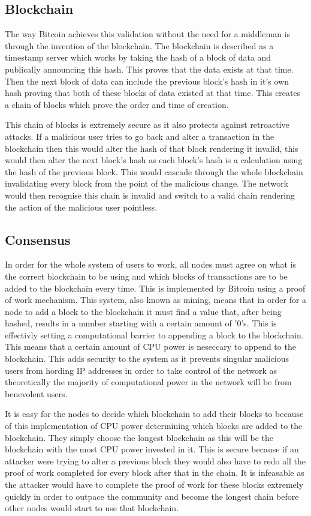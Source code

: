 \documentclass{l4proj}
\begin{document}
\subsection{Blockchain}
The way Bitcoin achieves this validation without the need for a middleman is through the invention of the blockchain.
The blockchain is described as a timestamp server which works by taking the hash of a block of data and publically
announcing this hash. This proves that the data exists at that time. Then the next block of data can include the
previous block's hash in it's own hash proving that both of these blocks of data existed at that time. This creates 
a chain of blocks which prove the order and time of creation.

This chain of blocks is extremely secure as it also protects against retroactive attacks. If a malicious user tries
to go back and alter a transaction in the blockchain then this would alter the hash of that block rendering it invalid,
this would then alter the next block's hash as each block's hash is a calculation using the hash of the previous block.
This would cascade through the whole blockchain invalidating every block from the point of the malicious change. The 
network would then recognise this chain is invalid and switch to a valid chain rendering the action of the malicious
user pointless.

\subsection{Consensus}
In order for the whole system of users to work, all nodes must agree on what is the correct blockchain to be using and
which blocks of transactions are to be added to the blockchain every time. This is implemented by Bitcoin using a proof of
work mechanism. This system, also known as mining, means that in order for a node to add a block to the blockchain it
must find a value that, after being hashed, results in a number starting with a certain amount of '0's. This is 
effectivly setting a computational barrier to appending a block to the blockchain. This means that a certain amount of
CPU power is neseccary to append to the blockchain. This adds security to the system as it prevents singular malicious
users from hording IP addresses in order to take control of the network as theoretically the majority of computational
power in the network will be from benevolent users.


It is easy for the nodes to decide which blockchain to add their blocks to because of this implementation of CPU power
determining which blocks are added to the blockchain. They simply choose the longest blockchain as this will be
the blockchain with the most CPU power invested in it. This is secure because if an attacker were trying to alter a 
previous block they would also have to redo all the proof of work completed for every block after that in the chain.
It is infeasable as the attacker would have to complete the proof of work for these blocks extremely quickly in order
to outpace the community and become the longest chain before other nodes would start to use that blockchain.
\end{document}
